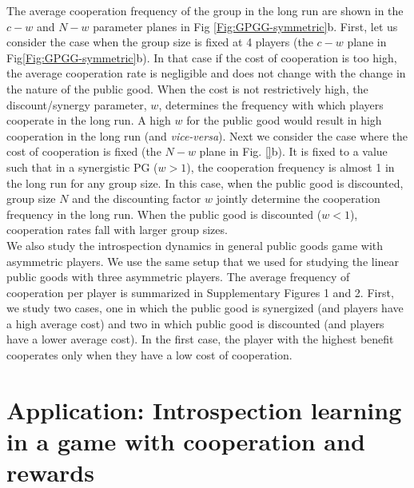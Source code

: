 \documentclass[11pt]{article}
\theoremstyle{plainCl1}
\theoremstyle{plainCl2}
\begin{document}
\noindent The average cooperation frequency of the group in the long run are shown in the $c-w$ and $N-w$ parameter planes in Fig \ref{Fig:GPGG-symmetric}b. First, let us consider the case when the group size is fixed at 4 players (the $c-w$ plane in Fig\ref{Fig:GPGG-symmetric}b). In that case if the cost of cooperation is too high, the average cooperation rate is negligible and does not change with the change in the nature of the public good. When the cost is not restrictively high, the discount/synergy parameter, $w$, determines the frequency with which players cooperate in the long run. A high $w$ for the public good would result in high cooperation in the long run (and \emph{vice-versa}). Next we consider the case where the cost of cooperation is fixed (the $N-w$ plane in Fig. \ref{}b). It is fixed to a value such that in a synergistic PG ($w > 1$), the cooperation frequency is almost 1 in the long run for any group size. In this case, when the public good is discounted, group size $N$ and the discounting factor $w$ jointly determine the cooperation frequency in the long run. When the public good is discounted ($w < 1$), cooperation rates fall with larger group sizes.\\ 
\noindent 
We also study the introspection dynamics in general public goods game with asymmetric players. We use the same setup that we used for studying the linear public goods with three asymmetric players. The average frequency of cooperation per player is summarized in Supplementary Figures 1 and 2. First, we study two cases, one in which the public good is synergized (and players have a high average cost) and two in which public good is discounted (and players have a lower average cost). In the first case, the player with the highest benefit cooperates only when they have a low cost of cooperation. 
\section*{Application: Introspection learning in a game with cooperation and rewards}
\end{document}
